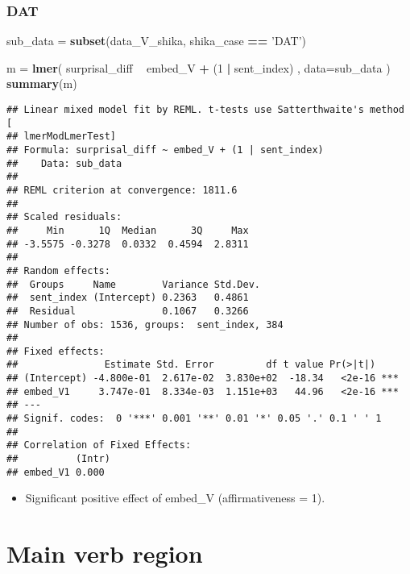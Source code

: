 \documentclass[]{ltjsarticle}
\newenvironment{Shaded}{\begin{snugshade}}{\end{snugshade}}
\newcommand{\KeywordTok}[1]{\textcolor[rgb]{0.13,0.29,0.53}{\textbf{#1}}}
\newcommand{\DataTypeTok}[1]{\textcolor[rgb]{0.13,0.29,0.53}{#1}}
\newcommand{\DecValTok}[1]{\textcolor[rgb]{0.00,0.00,0.81}{#1}}
\newcommand{\StringTok}[1]{\textcolor[rgb]{0.31,0.60,0.02}{#1}}
\newcommand{\OperatorTok}[1]{\textcolor[rgb]{0.81,0.36,0.00}{\textbf{#1}}}
\newcommand{\NormalTok}[1]{#1}
\providecommand{\tightlist}{%
  \setlength{\itemsep}{0pt}\setlength{\parskip}{0pt}}
\begin{document}
\subsubsection{DAT}\label{dat}

\begin{Shaded}
\begin{Highlighting}[]
\NormalTok{sub_data =}\StringTok{ }\KeywordTok{subset}\NormalTok{(data_V_shika, shika_case }\OperatorTok{==}\StringTok{ 'DAT'}\NormalTok{)}

\NormalTok{m =}\StringTok{ }\KeywordTok{lmer}\NormalTok{(}
\NormalTok{        surprisal_diff}
            \OperatorTok{~}\StringTok{ }\NormalTok{embed_V}
                \OperatorTok{+}\StringTok{ }\NormalTok{(}\DecValTok{1} \OperatorTok{|}\StringTok{ }\NormalTok{sent_index)}
\NormalTok{        ,}
        \DataTypeTok{data=}\NormalTok{sub_data}
\NormalTok{        )}
\KeywordTok{summary}\NormalTok{(m)}
\end{Highlighting}
\end{Shaded}

\begin{verbatim}
## Linear mixed model fit by REML. t-tests use Satterthwaite's method [
## lmerModLmerTest]
## Formula: surprisal_diff ~ embed_V + (1 | sent_index)
##    Data: sub_data
## 
## REML criterion at convergence: 1811.6
## 
## Scaled residuals: 
##     Min      1Q  Median      3Q     Max 
## -3.5575 -0.3278  0.0332  0.4594  2.8311 
## 
## Random effects:
##  Groups     Name        Variance Std.Dev.
##  sent_index (Intercept) 0.2363   0.4861  
##  Residual               0.1067   0.3266  
## Number of obs: 1536, groups:  sent_index, 384
## 
## Fixed effects:
##               Estimate Std. Error         df t value Pr(>|t|)    
## (Intercept) -4.800e-01  2.617e-02  3.830e+02  -18.34   <2e-16 ***
## embed_V1     3.747e-01  8.334e-03  1.151e+03   44.96   <2e-16 ***
## ---
## Signif. codes:  0 '***' 0.001 '**' 0.01 '*' 0.05 '.' 0.1 ' ' 1
## 
## Correlation of Fixed Effects:
##          (Intr)
## embed_V1 0.000
\end{verbatim}

\begin{itemize}
\tightlist
\item
  Significant positive effect of embed\_V (affirmativeness = 1).
\end{itemize}

\section{Main verb region}\label{main-verb-region}
\end{document}

